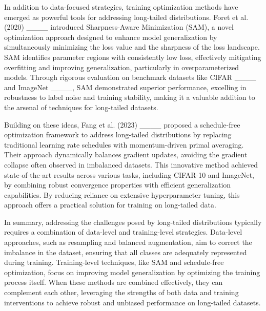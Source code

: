 In addition to data-focused strategies, training optimization methods have emerged as powerful tools for addressing long-tailed distributions. Foret et al. (2020) ____ introduced Sharpness-Aware Minimization (SAM), a novel optimization approach designed to enhance model generalization by simultaneously minimizing the loss value and the sharpness of the loss landscape. SAM identifies parameter regions with consistently low loss, effectively mitigating overfitting and improving generalization, particularly in overparameterized models. Through rigorous evaluation on benchmark datasets like CIFAR ____ and ImageNet ____, SAM demonstrated superior performance, excelling in robustness to label noise and training stability, making it a valuable addition to the arsenal of techniques for long-tailed datasets.

Building on these ideas, Fang et al. (2023) ____ proposed a schedule-free optimization framework to address long-tailed distributions by replacing traditional learning rate schedules with momentum-driven primal averaging. Their approach dynamically balances gradient updates, avoiding the gradient collapse often observed in imbalanced datasets. This innovative method achieved state-of-the-art results across various tasks, including CIFAR-10 and ImageNet, by combining robust convergence properties with efficient generalization capabilities. By reducing reliance on extensive hyperparameter tuning, this approach offers a practical solution for training on long-tailed data.

In summary, addressing the challenges posed by long-tailed distributions typically requires a combination of data-level and training-level strategies. Data-level approaches, such as resampling and balanced augmentation, aim to correct the imbalance in the dataset, ensuring that all classes are adequately represented during training. Training-level techniques, like SAM and schedule-free optimization, focus on improving model generalization by optimizing the training process itself. When these methods are combined effectively, they can complement each other, leveraging the strengths of both data and training interventions to achieve robust and unbiased performance on long-tailed datasets.